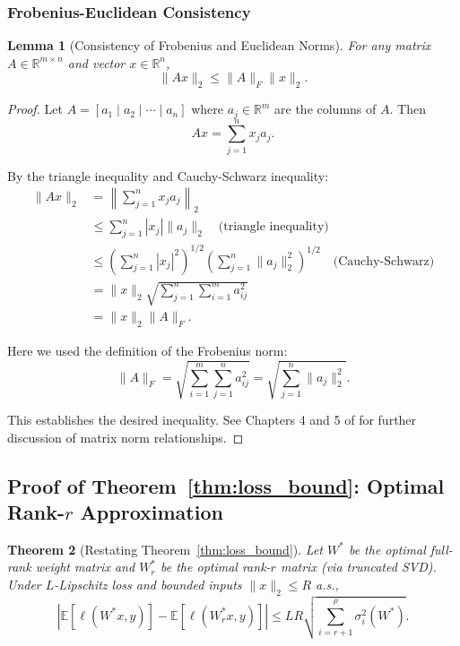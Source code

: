 \documentclass{article}
\theoremstyle{plain}
\newtheorem{theorem}{Theorem}[section]
\newtheorem{lemma}[theorem]{Lemma}
\theoremstyle{definition}
\theoremstyle{remark}
\begin{document}
\subsubsection{Frobenius-Euclidean Consistency}\label{app:frobenius_consistency_subsec}

\begin{lemma}[Consistency of Frobenius and Euclidean Norms]
\label{lem:frobenius_consistency}
For any matrix $A \in \mathbb{R}^{m \times n}$ and vector $x \in \mathbb{R}^n$,
\[
\|Ax\|_2 \leq \|A\|_F \|x\|_2.
\]
\end{lemma}

\begin{proof}
Let $A = [a_1 \mid a_2 \mid \cdots \mid a_n]$ where $a_j \in \mathbb{R}^m$ are the columns of $A$. Then
\[
Ax = \sum_{j=1}^{n} x_j a_j.
\]

By the triangle inequality and Cauchy-Schwarz inequality:
\begin{align*}
\|Ax\|_2 
&= \left\|\sum_{j=1}^{n} x_j a_j\right\|_2 \\
&\leq \sum_{j=1}^{n} |x_j| \|a_j\|_2 
\quad \text{(triangle inequality)} \\
&\leq \left(\sum_{j=1}^{n} |x_j|^2\right)^{1/2} \left(\sum_{j=1}^{n} \|a_j\|_2^2\right)^{1/2} 
\quad \text{(Cauchy-Schwarz)} \\
&= \|x\|_2 \sqrt{\sum_{j=1}^{n} \sum_{i=1}^{m} a_{ij}^2} \\
&= \|x\|_2 \|A\|_F.
\end{align*}

Here we used the definition of the Frobenius norm:
\[
\|A\|_F = \sqrt{\sum_{i=1}^{m} \sum_{j=1}^{n} a_{ij}^2} 
= \sqrt{\sum_{j=1}^{n} \|a_j\|_2^2}.
\]

This establishes the desired inequality. See Chapters 4 and 5 of \cite{ford2014numerical} for further discussion of matrix norm relationships.
\end{proof}

\subsection{Proof of Theorem~\ref{thm:loss_bound}: Optimal Rank-$r$ Approximation}\label{app:optimal_loss_proof}

\begin{theorem}[Restating Theorem~\ref{thm:loss_bound}]
Let $W^*$ be the optimal full-rank weight matrix and $W^*_r$ be the optimal rank-$r$ matrix (via truncated SVD). Under $L$-Lipschitz loss and bounded inputs $\|x\|_2 \leq R$ a.s.,
\[
|\mathbb{E}[\ell(W^* x, y)] - \mathbb{E}[\ell(W^*_r x, y)]| 
\leq LR\sqrt{\sum_{i=r+1}^{\rho} \sigma_i^2(W^*)}.
\]
\end{theorem}
\end{document}
